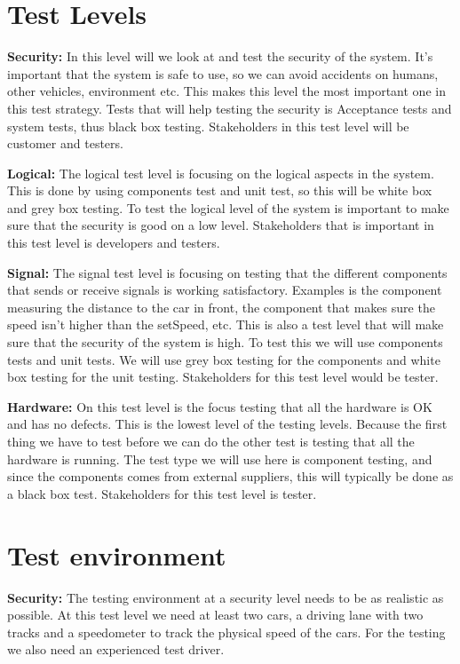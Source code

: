 	\clearpage
	\section{Test Levels}
				
		{\bf Security:} In this level will we look at and test the security of the system. 
		It’s important that the system is safe to use, so we can avoid accidents on humans, 
		other vehicles, environment etc. This makes this level the most important one in this 
		test strategy. Tests that will help testing the security is Acceptance tests and system 
		tests, thus black box testing. Stakeholders in this test level will be customer and 
		testers.

		{\bf Logical:} The logical test level is focusing on the logical aspects in the system. 
		This is done by using components test and unit test, so this will be white box and grey 
		box testing. To test the logical level of the system is important to make sure that the 
		security is good on a low level. Stakeholders that is important in this test level is 
		developers and testers.

		{\bf Signal:} The signal test level is focusing on testing that the different components 
		that sends or receive signals is working satisfactory. Examples is the component measuring 
		the distance to the car in front,  the component that makes sure the speed isn’t higher 
		than the setSpeed, etc. This is also a test level that will make sure that the security of 
		the system is high. To test this we will use components tests and unit tests. We will use 
		grey box testing for the components and white box testing for the unit testing. Stakeholders 
		for this test level would be tester.
		
		{\bf Hardware:} On this test level is the focus testing that all the hardware is OK 
 		and has no defects. This is the lowest level of the testing levels. Because the first 
 		thing we have to test before we can do the other test is testing that all the hardware 				
 		is running. The test type we will use here is component testing, and since the components 
 		comes from external suppliers, this will typically be done as a black box test. 
 		Stakeholders for this test level is tester. 
 					
	
	\clearpage
	\section{Test environment}	

		{\bf Security:} The testing environment at a security level needs to be as realistic 
		as possible. At this test level we need at least two cars, a driving lane with two tracks 
		and a speedometer to track the physical speed of the cars. For the testing we also need
		an experienced test driver. 

